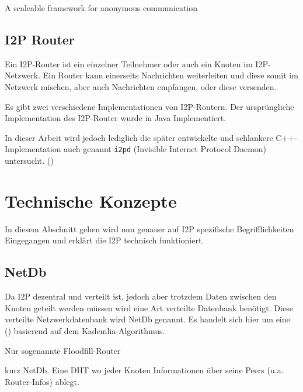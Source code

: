\cite{astolfi_i2p_2015}

\cite{timpanaro_birds_2012}

\cite{timpanaro_evaluation_2015}

A scaleable framework for anonymous communication
\cite{noauthor_i2p_nodate-8}


\cite{hoang_measuring_2019}
\cite{hoang_empirical_2018}

\cite{de_boer_invisible_2019}


\subsection{I2P Router}

Ein I2P-Router ist ein einzelner Teilnehmer oder auch ein Knoten im I2P-Netzwerk.
Ein Router kann einerseits Nachrichten weiterleiten und diese somit im Netzwerk mischen, aber auch Nachrichten empfangen, oder diese versenden.

Es gibt zwei verschiedene Implementationen von I2P-Routern.
Der ursprüngliche Implementation des I2P-Router wurde in Java Implementiert.

In dieser Arbeit wird jedoch lediglich die später entwickelte und schlankere C++-Implementation auch genannt \lstinline|i2pd| (Invisible Internet Protocol Daemon) untersucht. (\cite{noauthor_i})


\section{Technische Konzepte}
\label{sec:technischeKonzepte}

In diesem Abschnitt gehen wird nun genauer auf I2P spezifische Begrifflichkeiten Eingegangen und erklärt die I2P technisch funktioniert.

\subsection{NetDb}

Da I2P dezentral und verteilt ist, jedoch aber trotzdem Daten zwischen den Knoten geteilt werden müssen wird eine Art verteilte Datenbank benötigt.
Diese verteilte Netzwerkdatenbank wird NetDb genannt.
Es handelt sich hier um eine  () basierend auf dem Kademlia-Algorithmus.

Nur sogenannte Floodfill-Router 
\parencite[S.~5-6]{timpanaro_monitoring_nodate}


kurz NetDb. Eine DHT wo jeder Knoten
Informationen über seine Peers (u.a. Router-Infos) ablegt.

